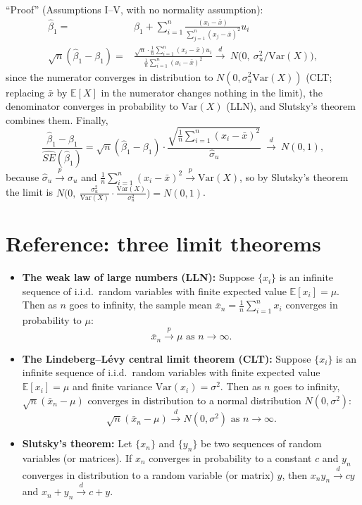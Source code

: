 \documentclass[11pt]{article}
\newcommand\E{\mathbb{E}}
\newcommand{\var}{\text{Var}}
\begin{document}
\begin{itemize}
``Proof'' (Assumptions I--V, with no normality assumption):
\begin{align*}
\hat{\beta}_1  =& \beta_1 + \sum_{i=1}^n \frac{(x_i - \bar{x})}{\sum_{j=1}^n(x_j-\bar{x})^2}u_i\\
\sqrt{n}(\hat\beta_1 - \beta_1) =& \frac{\sqrt{n}\cdot \frac{1}{n}\sum_{i=1}^n(x_i-\bar{x})u_i}{\frac{1}{n}\sum_{i=1}^n(x_i-\bar{x})^2} \stackrel{d}{\longrightarrow} \ N\big(0,\ \sigma_{u}^{2}/\var(X)\big),
\end{align*}
since the numerator converges in distribution to $N(0, \sigma_u^2\var(X))$ (CLT; replacing $\bar x$ by $\E[X]$ in the numerator changes nothing in the limit), the denominator converges in probability to $\var(X)$ (LLN), and Slutsky's theorem combines them. Finally,
$$
\frac{\hat{\beta}_1 - \beta_1}{\widehat{SE}(\hat{\beta}_1)}
= \sqrt{n}(\hat\beta_1 - \beta_1)\cdot\frac{\sqrt{\frac{1}{n}\sum_{i=1}^n(x_i-\bar{x})^2}}{\hat\sigma_u}
\ \stackrel{d}{\longrightarrow}\ N(0,1),
$$
because $\hat\sigma_u \stackrel{p}{\rightarrow} \sigma_u$ and $\frac{1}{n}\sum_{i=1}^n(x_i-\bar{x})^2 \stackrel{p}{\rightarrow} \var(X)$, so by Slutsky's theorem the limit is $N\big(0,\ \frac{\sigma_u^2}{\var(X)}\cdot\frac{\var(X)}{\sigma_u^2}\big) = N(0,1)$.
\end{itemize}
\clearpage

\section{Reference: three limit theorems}

\begin{itemize}
\item \textbf{The weak law of large numbers (LLN):} Suppose $\{x_i\}$ is an infinite sequence of i.i.d.\ random variables with finite expected value $\E[x_i]=\mu$. Then as $n$ goes to infinity, the sample mean $\bar x_n=\frac{1}{n}\sum_{i=1}^{n} x_i$ converges in probability to $\mu$:
    \[
    \bar x_n \stackrel{p}{\longrightarrow} \mu \text{ as } n \rightarrow\infty.
    \]

\item \textbf{The Lindeberg--L\'evy central limit theorem (CLT):} Suppose $\{x_i\}$ is an infinite sequence of i.i.d.\ random variables with finite expected value $\E[x_i]=\mu$ and finite variance $\var(x_i)=\sigma^2$. Then as $n$ goes to infinity, $\sqrt{n}(\bar{x}_n-\mu)$ converges in distribution to a normal distribution $N(0,\sigma^2)$:
    \[
    \sqrt{n}(\bar{x}_n-\mu)\stackrel{d}{\longrightarrow} N(0,\sigma^2) \text{ as } n \rightarrow\infty.
    \]

\item \textbf{Slutsky's theorem:} Let $\{x_n\}$ and $\{y_n\}$ be two sequences of random variables (or matrices). If $x_n$ converges in probability to a constant $c$ and $y_n$ converges in distribution to a random variable (or matrix) $y$, then $x_n y_n \stackrel{d}{\longrightarrow} cy$ and $x_n + y_n \stackrel{d}{\longrightarrow} c + y$.
\end{itemize}
\end{document}
